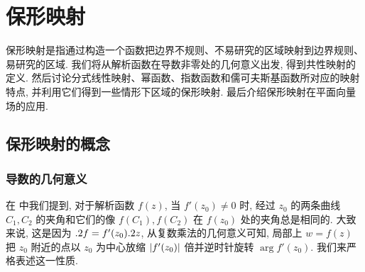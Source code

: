 \chapter{保形映射}
\label{chapter:6}

保形映射是指通过构造一个函数把边界不规则、不易研究的区域映射到边界规则、易研究的区域.
我们将从解析函数在导数非零处的几何意义出发, 得到共性映射的定义.
然后讨论分式线性映射、幂函数、指数函数和儒可夫斯基函数所对应的映射特点, 并利用它们得到一些情形下区域的保形映射.
最后介绍保形映射在平面向量场的应用.



\section{保形映射的概念}

\subsection{导数的几何意义}


在 中我们提到, 对于解析函数 $f(z)$, 当 $f'(z_0)\neq 0$ 时, 经过 $z_0$ 的两条曲线 $C_1,C_2$ 的夹角和它们的像 $f(C_1),f(C_2)$ 在 $f(z_0)$ 处的夹角总是相同的.
大致来说, 这是因为 $.2 f=f'(z_0).2 z$, 从复数乘法的几何意义可知, 局部上 $w=f(z)$ 把 $z_0$ 附近的点以 $z_0$ 为中心放缩 $\left|f'(z_0)\right|$ 倍并逆时针旋转 $\arg{f'(z_0)}$.
我们来严格表述这一性质.

